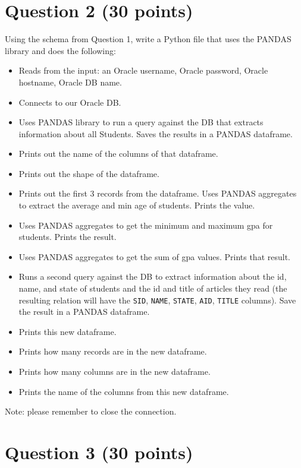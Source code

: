 \documentclass[letterpaper, 11pt]{article}
\begin{document}
\section*{Question 2 (30 points)}

Using the schema from Question 1, write a Python file that uses the PANDAS library and does the following:
\begin{itemize}[label=-]
    \item Reads from the input: an Oracle username, Oracle password, Oracle hostname, Oracle DB name.
    \item Connects to our Oracle DB.
    \item Uses PANDAS library to run a query against the DB that extracts information about all Students. Saves the results in a PANDAS dataframe.
    \item Prints out the name of the columns of that dataframe.
    \item Prints out the shape of the dataframe.
    \item Prints out the first 3 records from the dataframe. Uses PANDAS aggregates to extract the average and min age of students. Prints the value.
    \item Uses PANDAS aggregates to get the minimum and maximum gpa for students. Prints the result.
    \item Uses PANDAS aggregates to get the sum of gpa values. Prints that result.
    \item Runs a second query against the DB to extract information about the id, name, and state of students and the id and title of articles they read (the resulting relation will have the \texttt{SID}, \texttt{NAME}, \texttt{STATE}, \texttt{AID}, \texttt{TITLE} columns). Save the result in a PANDAS dataframe.
    \item Prints this new dataframe.
    \item Prints how many records are in the new dataframe.
    \item Prints how many columns are in the new dataframe.
    \item Prints the name of the columns from this new dataframe.
\end{itemize}

Note: please remember to close the connection.

\section*{Question 3 (30 points)}
\end{document}
